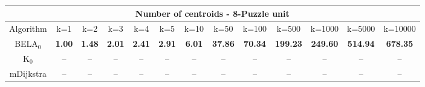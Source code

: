 \begin{tabular}{c|cccccccccccc}\toprule
\multicolumn{13}{c}{Number of centroids - 8-Puzzle unit}\\ \midrule
Algorithm & k=1 & k=2 & k=3 & k=4 & k=5 & k=10 & k=50 & k=100 & k=500 & k=1000 & k=5000 & k=10000 \\ \midrule
BELA$_0$ & \textbf{1.00} & \textbf{1.48} & \textbf{2.01} & \textbf{2.41} & \textbf{2.91} & \textbf{6.01} & \textbf{37.86} & \textbf{70.34} & \textbf{199.23} & \textbf{249.60} & \textbf{514.94} & \textbf{678.35} \\
K$_0$ & -- & -- & -- & -- & -- & -- & -- & -- & -- & -- & -- & -- \\
mDijkstra & -- & -- & -- & -- & -- & -- & -- & -- & -- & -- & -- & -- \\ \bottomrule 
\end{tabular}
